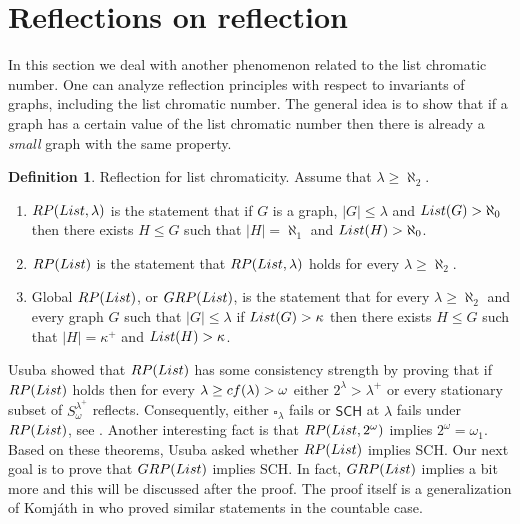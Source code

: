 \documentclass[11pt]{amsart}
\theoremstyle{definition}
\newtheorem{definition}[theorem]{Definition}
\theoremstyle{remark}
\newcommand{\cf}{{\rm cf}}
\begin{document}
\newpage

\section{Reflections on reflection}

In this section we deal with another phenomenon related to the list chromatic number.
One can analyze reflection principles with respect to invariants of graphs, including the list chromatic number.
The general idea is to show that if a graph has a certain value of the list chromatic number then there is already a \emph{small} graph with the same property.

\begin{definition}
\label{defrplist} Reflection for list chromaticity. \newline
Assume that $\lambda\geq\aleph_2$.
\begin{enumerate}
\item [$(\aleph)$] ${\rm RP}({\rm List},\lambda)$ is the statement that if $G$ is a graph, $|G|\leq\lambda$ and ${\rm List}(G)>\aleph_0$ then there exists $H\leq G$ such that $|H|=\aleph_1$ and ${\rm List}(H)>\aleph_0$.
\item [$(\beth)$] ${\rm RP}({\rm List})$ is the statement that ${\rm RP}({\rm List},\lambda)$ holds for every $\lambda\geq\aleph_2$.
\item [$(\gimel)$] Global ${\rm RP}({\rm List})$, or ${\rm GRP}({\rm List})$, is the statement that for every $\lambda\geq\aleph_2$ and every graph $G$ such that $|G|\leq\lambda$ if ${\rm List}(G)>\kappa$ then there exists $H\leq G$ such that $|H|=\kappa^+$ and ${\rm List}(H)>\kappa$.
\end{enumerate}
\end{definition}

Usuba showed that ${\rm RP}({\rm List})$ has some consistency strength by proving that if ${\rm RP}({\rm List})$ holds then for every $\lambda\geq\cf(\lambda)>\omega$ either $2^\lambda>\lambda^+$ or every stationary subset of $S^{\lambda^+}_\omega$ reflects.
Consequently, either $\square_\lambda$ fails or $\textsf{SCH}$ at $\lambda$ fails under ${\rm RP}({\rm List})$, see \cite[Proposition 4.6]{MR4732367}.
Another interesting fact is that ${\rm RP}({\rm List},2^\omega)$ implies $2^\omega=\omega_1$.
Based on these theorems, Usuba asked whether ${\rm RP}(\rm List)$ implies \textsf{SCH}.
Our next goal is to prove that ${\rm GRP}({\rm List})$ implies \textsf{SCH}.
In fact, ${\rm GRP}({\rm List})$ implies a bit more and this will be discussed after the proof.
The proof itself is a generalization of Komj\'{a}th in \cite{MR3096584} who proved similar statements in the countable case.
\end{document}

